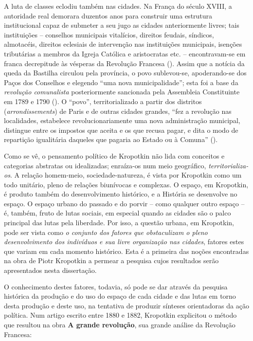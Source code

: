 A luta de classes eclodiu também nas cidades. Na França do século XVIII, a autoridade real demorara duzentos anos para construir uma estrutura institucional capaz de submeter a seu jugo as cidades anteriormente livres; tais instituições -- conselhos municipais vitalícios, direitos feudais, síndicos, almotacéis, direitos eclesiais de intervenção nas instituições municipais, isenções tributárias a membros da Igreja Católica e aristocratas etc. -- encontravam-se em franca decrepitude às vésperas da Revolução Francesa (). Assim que a notícia da queda da Bastilha circulou pela província, o povo sublevou-se, apoderando-se dos Paços dos Conselhos e elegendo  ``uma nova municipalidade''; esta foi a base da \textit{revolução comunalista }posteriormente sancionada pela Assembleia Constituinte em 1789 e 1790 (). O ``povo'', territorializado a partir dos distritos (\textit{arrondissements}) de Paris e de outras cidades grandes, ``fez a revolução nas localidades, estabelece revolucionariamente uma nova administração municipal, distingue entre os impostos que aceita e os que recusa pagar, e dita o modo de repartição igualitária daqueles que pagaria ao Estado ou à Comuna'' ().

Como se vê, o pensamento político de Kropotkin não lida com conceitos e categorias abstratas ou idealizadas; enraíza-os num meio geográfico, \textit{territorializa-os}. A relação homem-meio, sociedade-natureza, é vista por Kropotkin como um todo unitário, pleno de relações biunívocas e complexas. O espaço, em Kropotkin, é produto também do desenvolvimento histórico, e a História se desenvolve no espaço. O espaço urbano do passado e do porvir -- como qualquer outro espaço -- é, também, fruto de lutas sociais, em especial quando as cidades são o palco principal das lutas pela liberdade. Por isso, a questão urbana, em Kropotkin, pode ser vista como \textit{o conjunto dos fatores que obstaculizam o pleno desenvolvimento dos indivíduos e sua livre organização nas cidades}, fatores estes que variam em cada momento histórico. Esta é a primeira das noções encontradas na obra de Piotr Kropotkin a permear a pesquisa cujos resultados serão apresentados nesta dissertação.

O conhecimento destes fatores, todavia, só pode se dar através da pesquisa histórica da produção e do uso do espaço de cada cidade e das lutas em torno desta produção e deste uso, na tentativa de produzir sínteses orientadoras da ação política. Num artigo escrito entre 1880 e 1882, Kropotkin explicitou o método que resultou na obra \textbf{A grande revolução}, sua grande análise da Revolução Francesa: 

